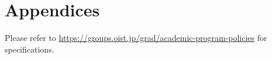

\section{Appendices} \label{appA}

Please refer to \url{https://groups.oist.jp/grad/academic-program-policies} for specifications.
